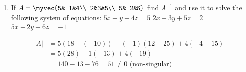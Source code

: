 \begin{enumerate}[label=\thesubsection.\arabic*, ref=\thesubsection.\theenumi]
\solution 

\textbf{Equation of line $AB$ passing through $A(2,0)$ and $B(4,5)$:}
$$
y - 0 = \frac{5 - 0}{4 - 2}(x - 2) \\$$
$$y = \frac{5}{2}(x - 2) \quad \implies y_1 = \frac{5}{2}(x - 2)
$$

\textbf{Equation of line $BC$ passing through $B(4,5)$ and $C(6,3)$:}
$$
y - 5 = \frac{3 - 5}{6 - 4}(x - 4) $$
$$y - 5 = \frac{-2}{2}(x - 4) $$
$$y - 5 = -(x - 4) \quad \implies y_2 = 9 - x
$$

\textbf{Equation of line $AC$ passing through $A(2,0)$ and $C(6,3)$:}
$$
y - 0 = \frac{3 - 0}{6 - 2}(x - 2) \\$$
$$y = \frac{3}{4}(x - 2) \quad \implies y_3 = \frac{3}{4}(x - 2)
$$

$$
\text{Ar}(\triangle ABC) = \text{Area under } AB \, (x \in [2,4]) + \text{Area under } BC  (x\in[4,6]) - \text{Area under } AC  \\$$
$$= \int_{2}^{4} \frac{5}{2}(x - 2)\,dx + \int_{4}^{6} (9 - x)\,dx - \int_{2}^{6} \frac{3}{4}(x - 2)\,dx$$

Evaluating the integrals individually:
$$
I_1 = \frac{5}{2} \left[ \frac{(x-2)^2}{2} \right]_{2}^{4} = \frac{5}{2} \left( \frac{4}{2} - 0 \right) = 5 \\$$
$$I_2 = \left[ 9x - \frac{x^2}{2} \right]_{4}^{6} = \left( 54 - 18 \right) - \left( 36 - 8 \right) = 36 - 28 = 8 \\$$
$$I_3 = \frac{3}{4} \left[ \frac{(x-2)^2}{2} \right]_{2}^{6} = \frac{3}{4} \left( \frac{16}{2} - 0 \right) = 6
$$

Combining the results:
\begin{align*}
\text{Area}(\triangle ABC) &= I_1 + I_2 - I_3 \\
&= 5 + 8 - 6 \\
&= 7 \text{ sq. units}
\end{align*}

area $\implies 7 \text{ sq. units}$

\item

If $A=\myvec{5&-1&4\\ 2&3&5\\ 5&-2&6}$ find $A^{-1}$ and use it to solve the following system of equations:
$5x-y+4z=5$\newline
$2x+3y+5z=2$\newline 
$5x-2y+6z=-1$

\solution 

\begin{align*}
|A| &= 5(18 - (-10)) - (-1)(12 - 25) + 4(-4 - 15) \\
&= 5(28) + 1(-13) + 4(-19) \\
&= 140 - 13 - 76 = 51 \neq 0 \text{ (non-singular)}
\end{align*}


\end{enumerate}
